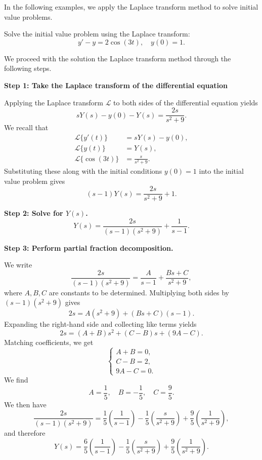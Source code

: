 In the following examples, we apply the Laplace transform method to solve initial value problems.

\begin{example}  
	Solve the initial value problem using the Laplace transform:
	\[y'-y= 2\cos(3t), \quad y(0) = 1.\]
	
	\begin{solution} We proceed with the solution  the Laplace transform method through the following steps.
		\smallskip
		
	\noindent\textbf{Step 1: Take the Laplace transform of the differential equation}
	
		Applying the Laplace transform $\mathscr{L}$ to both sides of the differential equation yields
		\[
		sY(s) - y(0) - Y(s) = \frac{2s}{s^2 + 9}.
		\]
	We recall that
		\[
		\begin{split}
			\mathscr{L}\{y'(t)\} &= s Y(s) - y(0), \\ 
			\mathscr{L}\{y(t)\} &= Y(s), \\ 
			\mathscr{L}\{\cos(3t)\} &= \frac{s}{s^2 + 9}.
		\end{split}
		\]	
		Substituting these along with the initial conditions 
		\(
		y(0) = 1
		\) into the initial value problem gives
		\[
		(s - 1)Y(s) = \frac{2s}{s^2 + 9} + 1.
		\]
		
	\noindent	\textbf{Step 2: Solve for \( Y(s) \).}
		\[
		Y(s) = \frac{2s}{(s - 1)(s^2 + 9)} + \frac{1}{s - 1}.
		\]
		
		\noindent\textbf{Step 3: Perform partial fraction decomposition.}
		
		We write
		\[
		\frac{2s}{(s - 1)(s^2 + 9)} = \frac{A}{s - 1} + \frac{Bs + C}{s^2 + 9},
		\] where $A, B, C$ are constants to be determined.
		Multiplying both sides by \( (s - 1)(s^2 + 9) \) gives
		\[
		2s = A(s^2 + 9) + (Bs + C)(s - 1).
		\]
		Expanding the right-hand side and collecting like terms yields
		\[
		2s 
		= (A + B)s^2 + (C - B)s + (9A - C).
		\]
		Matching coefficients, we get
		\[
		\begin{cases}
			A + B = 0, \\
			C - B = 2, \\
			9A - C = 0.
		\end{cases}
		\]
	We find
		\[
		A = \frac{1}{5}, \quad B = -\frac{1}{5}, \quad C = \frac{9}{5}.
		\]
	We then have
		\[
		\frac{2s}{(s - 1)(s^2 + 9)} = \frac{1}{5} \left( \frac{1}{s - 1}\right) - \frac{1}{5} \left( \frac{s}{s^2 + 9}\right) + \frac{9}{5} \left( \frac{1}{s^2 + 9}\right), 
		\]
	and therefore
		\[
		Y(s) = \frac{6}{5}\left( \frac{1}{s - 1}\right) - \frac{1}{5} \left( \frac{s}{s^2 + 9}\right) + \frac{9}{5} \left( \frac{1}{s^2 + 9}\right).
		\]
		

\end{solution}
\end{example}
